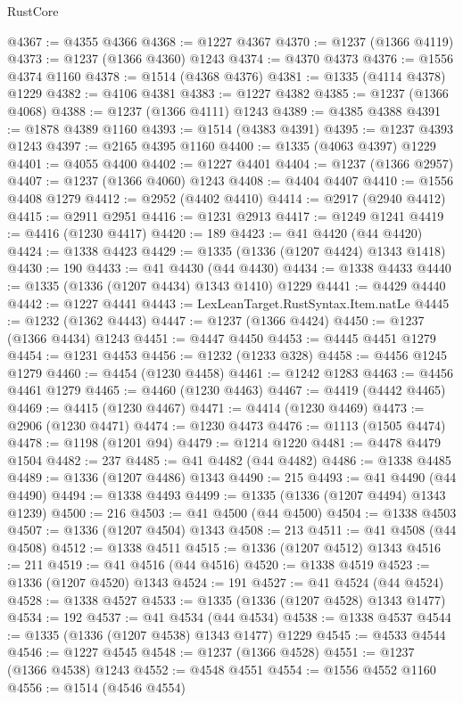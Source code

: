 \begin{lexlean}{RustCore}
\begin{coremodule}
@4367 := @4355 @4366
@4368 := @1227 @4367
@4370 := @1237 (@1366 @4119)
@4373 := @1237 (@1366 @4360) @1243
@4374 := @4370 @4373
@4376 := @1556 @4374 @1160
@4378 := @1514 (@4368 @4376)
@4381 := @1335 (@4114 @4378) @1229
@4382 := @4106 @4381
@4383 := @1227 @4382
@4385 := @1237 (@1366 @4068)
@4388 := @1237 (@1366 @4111) @1243
@4389 := @4385 @4388
@4391 := @1878 @4389 @1160
@4393 := @1514 (@4383 @4391)
@4395 := @1237 @4393 @1243
@4397 := @2165 @4395 @1160
@4400 := @1335 (@4063 @4397) @1229
@4401 := @4055 @4400
@4402 := @1227 @4401
@4404 := @1237 (@1366 @2957)
@4407 := @1237 (@1366 @4060) @1243
@4408 := @4404 @4407
@4410 := @1556 @4408 @1279
@4412 := @2952 (@4402 @4410)
@4414 := @2917 (@2940 @4412)
@4415 := @2911 @2951
@4416 := @1231 @2913
@4417 := @1249 @1241
@4419 := @4416 (@1230 @4417)
@4420 := 189
@4423 := @41 @4420 (@44 @4420)
@4424 := @1338 @4423
@4429 := @1335 (@1336 (@1207 @4424) @1343 @1418)
@4430 := 190
@4433 := @41 @4430 (@44 @4430)
@4434 := @1338 @4433
@4440 := @1335 (@1336 (@1207 @4434) @1343 @1410) @1229
@4441 := @4429 @4440
@4442 := @1227 @4441
@4443 := LexLeanTarget.RustSyntax.Item.natLe
@4445 := @1232 (@1362 @4443)
@4447 := @1237 (@1366 @4424)
@4450 := @1237 (@1366 @4434) @1243
@4451 := @4447 @4450
@4453 := @4445 @4451 @1279
@4454 := @1231 @4453
@4456 := @1232 (@1233 @328)
@4458 := @4456 @1245 @1279
@4460 := @4454 (@1230 @4458)
@4461 := @1242 @1283
@4463 := @4456 @4461 @1279
@4465 := @4460 (@1230 @4463)
@4467 := @4419 (@4442 @4465)
@4469 := @4415 (@1230 @4467)
@4471 := @4414 (@1230 @4469)
@4473 := @2906 (@1230 @4471)
@4474 := @1230 @4473
@4476 := @1113 (@1505 @4474)
@4478 := @1198 (@1201 @94)
@4479 := @1214 @1220
@4481 := @4478 @4479 @1504
@4482 := 237
@4485 := @41 @4482 (@44 @4482)
@4486 := @1338 @4485
@4489 := @1336 (@1207 @4486) @1343
@4490 := 215
@4493 := @41 @4490 (@44 @4490)
@4494 := @1338 @4493
@4499 := @1335 (@1336 (@1207 @4494) @1343 @1239)
@4500 := 216
@4503 := @41 @4500 (@44 @4500)
@4504 := @1338 @4503
@4507 := @1336 (@1207 @4504) @1343
@4508 := 213
@4511 := @41 @4508 (@44 @4508)
@4512 := @1338 @4511
@4515 := @1336 (@1207 @4512) @1343
@4516 := 211
@4519 := @41 @4516 (@44 @4516)
@4520 := @1338 @4519
@4523 := @1336 (@1207 @4520) @1343
@4524 := 191
@4527 := @41 @4524 (@44 @4524)
@4528 := @1338 @4527
@4533 := @1335 (@1336 (@1207 @4528) @1343 @1477)
@4534 := 192
@4537 := @41 @4534 (@44 @4534)
@4538 := @1338 @4537
@4544 := @1335 (@1336 (@1207 @4538) @1343 @1477) @1229
@4545 := @4533 @4544
@4546 := @1227 @4545
@4548 := @1237 (@1366 @4528)
@4551 := @1237 (@1366 @4538) @1243
@4552 := @4548 @4551
@4554 := @1556 @4552 @1160
@4556 := @1514 (@4546 @4554)

\end{coremodule}
\end{lexlean}

